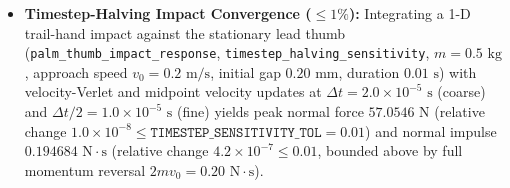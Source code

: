 \documentclass[11pt,a4paper]{article}
\begin{document}
\begin{itemize}[leftmargin=*,noitemsep]
\item \textbf{Timestep-Halving Impact Convergence ($\le 1\%$):} Integrating a 1-D trail-hand impact against the stationary lead thumb (\texttt{palm\_thumb\_impact\_response}, \texttt{timestep\_halving\_sensitivity}, $m = 0.5\text{ kg}$, approach speed $v_0 = 0.2\text{ m/s}$, initial gap $0.20\text{ mm}$, duration $0.01\text{ s}$) with velocity-Verlet and midpoint velocity updates at $\Delta t = 2.0\times 10^{-5}\text{ s}$ (coarse) and $\Delta t / 2 = 1.0\times 10^{-5}\text{ s}$ (fine) yields peak normal force $57.0546\text{ N}$ (relative change $1.0\times 10^{-8} \le \texttt{TIMESTEP\_SENSITIVITY\_TOL} = 0.01$) and normal impulse $0.194684\text{ N}\cdot\text{s}$ (relative change $4.2\times 10^{-7} \le 0.01$, bounded above by full momentum reversal $2 m v_0 = 0.20\text{ N}\cdot\text{s}$).
\end{itemize}
\end{document}
